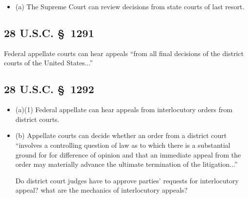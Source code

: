 \begin{itemize}
    \item (a) The Supreme Court can review decisions from state courts of last 
    resort.
\end{itemize}

\subsection{28 U.S.C. \S\ 1291}

Federal appellate courts can hear appeals ``from all final decisions of the 
district courts of the United States...''

\subsection{28 U.S.C. \S\ 1292}

\begin{itemize}
    \item (a)(1) Federal appellate can hear appeals from interlocutory orders 
    from district courts.
    \item (b) Appellate courts can decide whether an order from a district 
    court ``involves a controlling question of law as to which there is a 
    substantial ground for for difference of opinion and that an immediate 
    appeal from the order may materially advance the ultimate termination of 
    the litigation...''
    \item [Do district court judges have to approve parties' requests for 
    interlocutory appeal? what are the mechanics of interlocutory appeals?]
\end{itemize}
